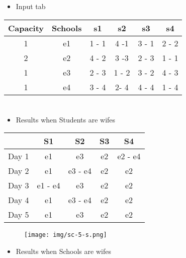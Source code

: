 \documentclass{article}
\begin{document}
\begin{itemize}
    \item Input tab
\end{itemize}

\begin{tabular}{|c|c|c|c|c|c|}
    \hline
    \textbf{Capacity} & \textbf{Schools} & \textbf{s1} & \textbf{s2} & \textbf{s3} & \textbf{s4} \\
    \hline
    1                 & e1               & 1 - 1       & 4 -1        & 3 - 1       & 2 - 2       \\
    \hline
    2                 & e2               & 4 - 2       & 3 -3        & 2 - 3       & 1 - 1       \\
    \hline
    1                 & e3               & 2 - 3       & 1 - 2       & 3 - 2       & 4 - 3       \\
    \hline
    1                 & e4               & 3 - 4       & 2- 4        & 4 - 4       & 1 - 4       \\
    \hline
\end{tabular}

\section*{}
\begin{itemize}
    \item Results when Students are wifes
\end{itemize}

\begin{tabular}{|c|c|c|c|c|}
    \hline
          & S1      & S2      & S3 & S4      \\
    \hline
    Day 1 & e1      & e3      & e2 & e2 - e4 \\
    \hline
    Day 2 & e1      & e3 - e4 & e2 & e2      \\
    \hline
    Day 3 & e1 - e4 & e3      & e2 & e2      \\
    \hline
    Day 4 & e1      & e3 - e4 & e2 & e2      \\
    \hline
    Day 5 & e1      & e3      & e2 & e2      \\
    \hline
\end{tabular}

\begin{figure}[h]
    \hspace{0.5cm}
    \texttt{[image: img/sc-5-s.png]}
\end{figure}
\newpage
\begin{itemize}
    \item Results when Schools are wifes
\end{itemize}
\end{document}
